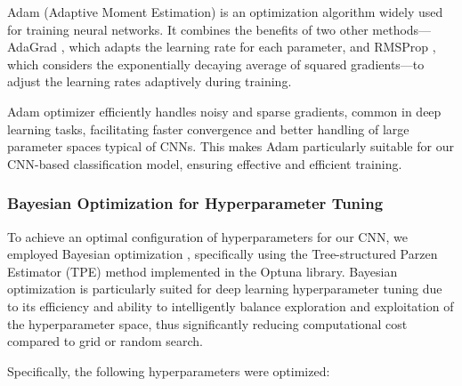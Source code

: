 \documentclass[
]{krantz}
\begin{document}
Adam (Adaptive Moment Estimation) \citep{Mehta2019} is an optimization algorithm widely used for training neural networks.
It combines the benefits of two other methods---AdaGrad \citep{Ward2020}, which adapts the learning rate for each parameter,
and RMSProp \citep{Zou2019}, which considers the exponentially decaying average of squared gradients---to adjust the learning rates adaptively during training.

Adam optimizer efficiently handles noisy and sparse gradients, common in deep learning tasks,
facilitating faster convergence and better handling of large parameter spaces typical of CNNs.
This makes Adam particularly suitable for our CNN-based classification model, ensuring effective and efficient training.

\subsubsection{Bayesian Optimization for Hyperparameter Tuning}\label{bayesian-optimization-for-hyperparameter-tuning}

To achieve an optimal configuration of hyperparameters for our CNN, we employed Bayesian optimization \citep{Garnett2023},
specifically using the Tree-structured Parzen Estimator (TPE) method \citep{Ozaki2022} implemented in the Optuna library.
Bayesian optimization is particularly suited for deep learning hyperparameter tuning due to its efficiency and ability to intelligently balance exploration and exploitation of the hyperparameter space, thus significantly reducing computational cost compared to grid or random search.

Specifically, the following hyperparameters were optimized:
\end{document}
